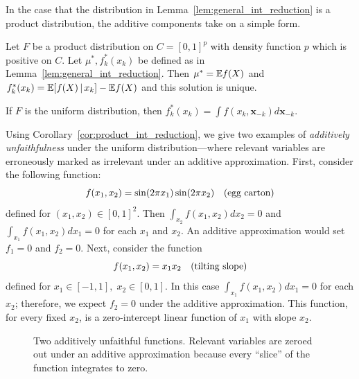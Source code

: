 In the case that the distribution in
Lemma~\ref{lem:general_int_reduction} is a product distribution, 
the additive components take on a simple form.

\begin{corollary}
\label{cor:product_int_reduction}
Let $F$ be a product distribution on $C=[0,1]^p$ with density function
$p$ which is positive on $C$. 
Let $\mu^*, f^*_k(x_k)$ be defined as in Lemma~\ref{lem:general_int_reduction}.
Then $\mu^* = {\mathbb E} f(X)$ and $f^*_k(x_k) = {\mathbb E}[ f(X) {\,|\,} x_k] - {\mathbb E} f(X)$ and this solution is unique.
\end{corollary}

If $F$ is the uniform distribution,
then $f^*_k(x_k) = \displaystyle\int f(x_k, \mathbf{x}_{-k})
d\mathbf{x}_{-k}$.

\begin{example} Using Corollary~\ref{cor:product_int_reduction}, we
  give two examples of \emph{additively unfaithfulness} under the
  uniform distribution---where relevant variables are
  erroneously marked as irrelevant under an additive
  approximation. First, consider the following function:
\[
f(x_1, x_2) = \sin( 2\pi x_1) \sin( 2 \pi x_2)\quad
\textrm{(egg carton)} 
\]
defined for $(x_1, x_2) \in [0,1]^2$.  Then
$\displaystyle\int_{x_2} f(x_1, x_2) d x_2 = 0$ and
$\displaystyle\int_{x_1} f(x_1, x_2) d x_1 = 0$ for each $x_1$ and $x_2$. An additive approximation
would set $f_1 = 0$ and $f_2 = 0$.  Next, consider the function
\[
f(x_1, x_2) = x_1 x_2 \quad \textrm{(tilting slope)} 
\]
defined for $x_1 \in [-1,1],\; x_2 \in [0,1]$.  In this case
$\displaystyle\int_{x_1} f(x_1, x_2) d x_1 = 0$ for each $x_2$; therefore, we expect $f_2 = 0$ under the additive approximation. This function, for every fixed $x_2$, is a zero-intercept linear function of $x_1$ with slope $x_2$.
\end{example}

\begin{figure}[htp]
\vskip-10pt
	\centering
\caption{Two additively unfaithful functions. Relevant variables are
  zeroed out under an additive approximation because every ``slice''
  of the function integrates to zero.}
\vskip-10pt
\end{figure}

